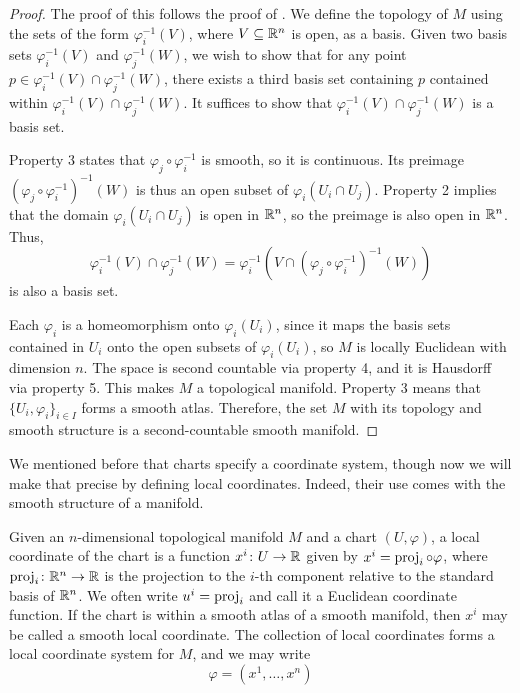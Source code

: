 \documentclass[a4paper,12pt]{article}
\begin{document}
\begin{proof}
    The proof of this follows the proof of \cite[Lem.~1.35]{Lee2012}.
    We define the topology of $M$ using the sets of the form $\varphi^{-1}_i(V)$, where $V \subseteq \mathbb{R}^n$ is open, as a basis.
    Given two basis sets $\varphi^{-1}_i(V)$ and $\varphi^{-1}_j(W)$, we wish to show that for any point $p \in \varphi^{-1}_i(V) \cap \varphi^{-1}_j(W)$, there exists a third basis set containing $p$ contained within $\varphi^{-1}_i(V) \cap \varphi^{-1}_j(W)$.
    It suffices to show that $\varphi^{-1}_i(V) \cap \varphi^{-1}_j(W)$ is a basis set.
    
    Property 3 states that $\varphi_j \circ \varphi^{-1}_i$ is smooth, so it is continuous.
    Its preimage $(\varphi_j \circ \varphi^{-1}_i)^{-1}(W)$ is thus an open subset of $\varphi_i(U_i \cap U_j)$. 
    Property 2 implies that the domain $\varphi_i(U_i \cap U_j)$ is open in $\mathbb{R}^n$, so the preimage is also open in $\mathbb{R}^n$.
    Thus,
    \begin{equation*}
        \varphi^{-1}_i(V) \cap \varphi^{-1}_j(W) = \varphi^{-1}_i(V \cap (\varphi_j \circ \varphi^{-1}_i)^{-1}(W))
    \end{equation*}
    is also a basis set.

    Each $\varphi_i$ is a homeomorphism onto $\varphi_i(U_i)$, since it maps the basis sets contained in $U_i$ onto the open subsets of $\varphi_i(U_i)$, so $M$ is locally Euclidean with dimension $n$.
    The space is second countable via property 4, and it is Hausdorff via property 5.
    This makes $M$ a topological manifold.
    Property 3 means that $\{U_i, \varphi_i\}_{i \in I}$ forms a smooth atlas.
    Therefore, the set $M$ with its topology and smooth structure is a second-countable smooth manifold.
\end{proof}
We mentioned before that charts specify a coordinate system, though now we will make that precise by defining local coordinates.
Indeed, their use comes with the smooth structure of a manifold.
\begin{definition}\label{def:local_coordinates}
    Given an $n$-dimensional topological manifold $M$ and a chart $(U, \varphi)$, a local coordinate of the chart is a function $x^i \colon U \to \mathbb{R}$ given by $x^i = \operatorname{proj}_i \circ \varphi$, where $\operatorname{proj}_i \colon \mathbb{R}^n \to \mathbb{R}$ is the projection to the $i$-th component relative to the standard basis of $\mathbb{R}^n$.
    We often write $u^i = \operatorname{proj}_i$ and call it a Euclidean coordinate function.
    If the chart is within a smooth atlas of a smooth manifold, then $x^i$ may be called a smooth local coordinate.
    The collection of local coordinates forms a local coordinate system for $M$, and we may write
    \begin{equation*}
        \varphi = (x^1, \ldots, x^n)
    \end{equation*}
\end{definition}
\end{document}
